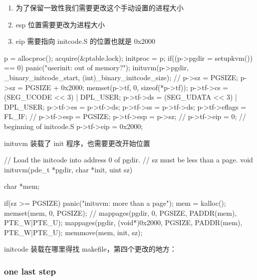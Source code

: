 \begin{enumerate}
    \item 为了保留一致性我们需要更改这个手动设置的进程大小
    \item esp 位置需要更改为进程大小
    \item eip 需要指向 initcode.S 的位置也就是 0x2000
\end{enumerate}

\begin{ccode}
    p = allocproc();
    acquire(&ptable.lock);
    initproc = p;
    if((p->pgdir = setupkvm()) == 0)
    panic("userinit: out of memory?");
    inituvm(p->pgdir, _binary_initcode_start, (int)_binary_initcode_size);
    // p->sz = PGSIZE;
    p->sz = PGSIZE + 0x2000;
    memset(p->tf, 0, sizeof(*p->tf));
    p->tf->cs = (SEG_UCODE << 3) | DPL_USER;
    p->tf->ds = (SEG_UDATA << 3) | DPL_USER;
    p->tf->es = p->tf->ds;
    p->tf->ss = p->tf->ds;
    p->tf->eflags = FL_IF;
    // p->tf->esp = PGSIZE;
    p->tf->esp = p->sz;
    // p->tf->eip = 0;  // beginning of initcode.S
    p->tf->eip = 0x2000;
\end{ccode}

inituvm 装载了 init 程序，也需要更改开始位置

\begin{ccode}
    // Load the initcode into address 0 of pgdir.
    // sz must be less than a page.
    void
    inituvm(pde_t *pgdir, char *init, uint sz)
    {
    char *mem;
    
    if(sz >= PGSIZE)
        panic("inituvm: more than a page");
    mem = kalloc();
    memset(mem, 0, PGSIZE);
    // mappages(pgdir, 0, PGSIZE, PADDR(mem), PTE_W|PTE_U);
    mappages(pgdir, (void*)0x2000, PGSIZE, PADDR(mem), PTE_W|PTE_U);
    memmove(mem, init, sz);
    }
\end{ccode}

initcode 装载在哪里得找 makefile，第四个更改的地方：


\subsubsection{one last step}

